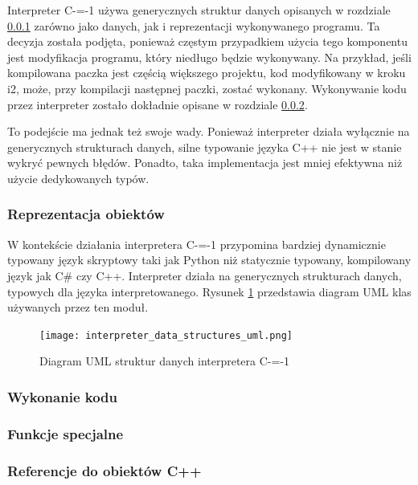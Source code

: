 Interpreter C-=-1 używa generycznych struktur danych opisanych w rozdziale \ref{implementation:interpreter:object_representation} zarówno jako danych, jak i reprezentacji wykonywanego programu.
Ta decyzja została podjęta, ponieważ częstym przypadkiem użycia tego komponentu jest modyfikacja programu, który niedługo będzie wykonywany.
Na przykład, jeśli kompilowana paczka jest częścią większego projektu, kod modyfikowany w kroku i2, może, przy kompilacji następnej paczki, zostać wykonany.
Wykonywanie kodu przez interpreter zostało dokładnie opisane w rozdziale \ref{implementation:interpreter:code_execution}.

To podejście ma jednak też swoje wady.
Ponieważ interpreter działa wyłącznie na generycznych strukturach danych, silne typowanie języka C++ nie jest w stanie wykryć pewnych błędów.
Ponadto, taka implementacja jest mniej efektywna niż użycie dedykowanych typów.

\subsubsection{Reprezentacja obiektów}
\label{implementation:interpreter:object_representation}

W kontekście działania interpretera C-=-1 przypomina bardziej dynamicznie typowany język skryptowy taki jak Python niż statycznie typowany, kompilowany język jak C\# czy C++.
Interpreter działa na generycznych strukturach danych, typowych dla języka interpretowanego.
Rysunek \ref{implementation:data_structures:uml_diagram} przedstawia diagram UML klas używanych przez ten moduł.


\begin{figure}
    \caption{Diagram UML struktur danych interpretera C-=-1}
    \label{implementation:data_structures:uml_diagram}
    \texttt{[image: interpreter\_data\_structures\_uml.png]}
\end{figure}

\subsubsection{Wykonanie kodu}
\label{implementation:interpreter:code_execution}

\subsubsection{Funkcje specjalne}
\label{implementation:interpreter:special_functions}

\subsubsection{Referencje do obiektów C++}
\label{implementation:interpreter:cpp_object_references}

